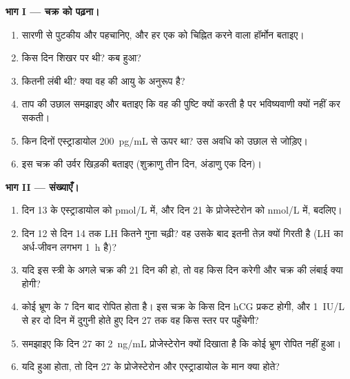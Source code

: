 \begin{problem}
\medskip
\noindent\textbf{भाग I --- चक्र को पढ़ना।}
\begin{enumerate}
  \item सारणी से पुटकीय और  पहचानिए,
        और हर एक को चिह्नित करने वाला हॉर्मोन बताइए।
  \item {} किस दिन शिखर पर थी?  कब हुआ?
  \item {} कितनी लंबी थी? क्या वह  की
        आयु के अनुरूप है?
  \item ताप की उछाल समझाइए और बताइए कि वह  की पुष्टि क्यों
        करती है पर भविष्यवाणी क्यों नहीं कर सकती।
  \item किन दिनों एस्ट्राडायोल \qty{200}{pg/mL} से ऊपर था? उस अवधि को
        उछाल से जोड़िए।
  \item इस चक्र की उर्वर खिड़की बताइए (शुक्राणु तीन दिन, अंडाणु
        एक दिन)।
\end{enumerate}

\medskip
\noindent\textbf{भाग II --- संख्याएँ।}
\begin{enumerate}[resume]
  \item दिन 13 के एस्ट्राडायोल को \unit{pmol/L} में, और
        दिन 21 के प्रोजेस्टेरोन को \unit{nmol/L} में, बदलिए।
  \item दिन 12 से दिन 14 तक LH कितने गुना चढ़ी? वह उसके बाद इतनी तेज़
        क्यों गिरती है (LH का अर्ध-जीवन लगभग
        \qty{1}{h} है)?
  \item यदि इस स्त्री के अगले चक्र की  21 दिन की हो, तो
        वह किस दिन  करेगी और चक्र की लंबाई क्या होगी?
  \item कोई भ्रूण  के 7 दिन बाद रोपित होता है। इस चक्र के
        किस दिन hCG प्रकट होगी, और \qty{1}{IU/L} से हर दो दिन में
        दुगुनी होते हुए दिन 27 तक वह किस स्तर पर पहुँचेगी?
  \item समझाइए कि दिन 27 का \qty{2}{ng/mL} प्रोजेस्टेरोन क्यों दिखाता
        है कि कोई भ्रूण रोपित नहीं हुआ।
  \item यदि हुआ होता, तो दिन 27 के प्रोजेस्टेरोन और एस्ट्राडायोल के
        मान क्या होते?
\end{enumerate}


\end{problem}
